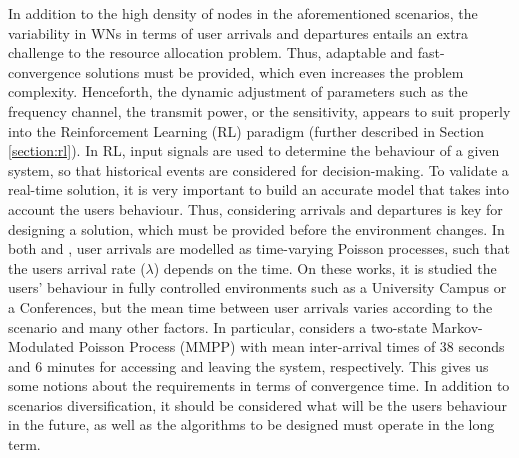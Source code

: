 \documentclass[12pt, a4paper,twoside]{tesi_upf}
\begin{document}
		In addition to the high density of nodes in the aforementioned scenarios, the variability in WNs in terms of user arrivals and departures entails an extra challenge to the resource allocation problem. Thus, adaptable and fast-convergence solutions must be provided, which even increases the problem complexity. Henceforth, the dynamic adjustment of parameters such as the frequency channel, the transmit power, or the sensitivity, appears to suit properly into the Reinforcement Learning (RL) paradigm (further described in Section \ref{section:rl}). In RL, input signals are used to determine the behaviour of a given system, so that historical events are considered for decision-making. To validate a real-time solution, it is very important to build an accurate model that takes into account the users behaviour. Thus, considering arrivals and departures is key for designing a solution, which must be provided before the environment changes. In both \cite{balachandran2002characterizing} and \cite{papadopouli2005modeling}, user arrivals are modelled as time-varying Poisson processes, such that the users arrival rate ($\lambda$) depends on the time. On these works, it is studied the users' behaviour in fully controlled environments such as a University Campus or a Conferences, but the mean time between user arrivals varies according to the scenario and many other factors. In particular, \cite{papadopouli2005modeling} considers a two-state Markov-Modulated Poisson Process (MMPP) with mean inter-arrival times of 38 seconds and 6 minutes for accessing and leaving the system, respectively. This gives us some notions about the requirements in terms of convergence time. In addition to scenarios diversification, it should be considered what will be the users behaviour in the future, as well as the algorithms to be designed must operate in the long term. 
			
\end{document}
